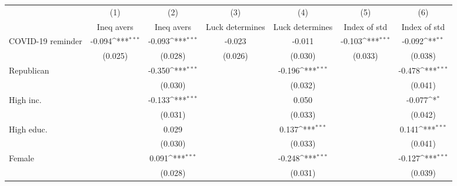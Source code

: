 {
\def\sym#1{\ifmmode^{#1}\else\(^{#1}\)\fi}
\begin{tabular}{l*{6}{c}}
\toprule
                    &\multicolumn{1}{c}{(1)}&\multicolumn{1}{c}{(2)}&\multicolumn{1}{c}{(3)}&\multicolumn{1}{c}{(4)}&\multicolumn{1}{c}{(5)}&\multicolumn{1}{c}{(6)}\\
                    &\multicolumn{1}{c}{Ineq avers}&\multicolumn{1}{c}{Ineq avers}&\multicolumn{1}{c}{Luck determines}&\multicolumn{1}{c}{Luck determines}&\multicolumn{1}{c}{Index of std}&\multicolumn{1}{c}{Index of std}\\
\midrule
COVID-19 reminder   &      -0.094\sym{***}&      -0.093\sym{***}&      -0.023         &      -0.011         &      -0.103\sym{***}&      -0.092\sym{**} \\
                    &     (0.025)         &     (0.028)         &     (0.026)         &     (0.030)         &     (0.033)         &     (0.038)         \\
\addlinespace
Republican          &                     &      -0.350\sym{***}&                     &      -0.196\sym{***}&                     &      -0.478\sym{***}\\
                    &                     &     (0.030)         &                     &     (0.032)         &                     &     (0.041)         \\
\addlinespace
High inc.           &                     &      -0.133\sym{***}&                     &       0.050         &                     &      -0.077\sym{*}  \\
                    &                     &     (0.031)         &                     &     (0.033)         &                     &     (0.042)         \\
\addlinespace
High educ.          &                     &       0.029         &                     &       0.137\sym{***}&                     &       0.141\sym{***}\\
                    &                     &     (0.030)         &                     &     (0.033)         &                     &     (0.041)         \\
\addlinespace
Female              &                     &       0.091\sym{***}&                     &      -0.248\sym{***}&                     &      -0.127\sym{***}\\
                    &                     &     (0.028)         &                     &     (0.031)         &                     &     (0.039)         \\

\end{tabular}}
